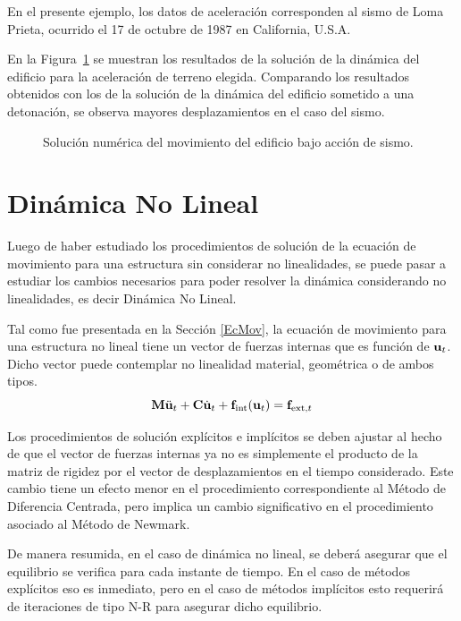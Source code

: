 En el presente ejemplo, los datos de aceleración corresponden al sismo de Loma Prieta, ocurrido el 17 de octubre de 1987 en California, U.S.A. %

En la Figura~\ref{fig:LomaPrieta} se muestran los resultados de la solución de la dinámica del edificio para la aceleración de terreno elegida. %
Comparando los resultados obtenidos con los de la solución de la dinámica del edificio sometido a una detonación, se observa mayores desplazamientos en el caso del sismo.

\begin{figure}[htb]
	\centering
	\resizebox{.95\linewidth}{!}{}
	\caption{Solución numérica del movimiento del edificio bajo acción de sismo.}
	\label{fig:LomaPrieta}
\end{figure}


\section{Dinámica No Lineal}\label{DinNoLin}

Luego de haber estudiado los procedimientos de solución de la ecuación de movimiento para una estructura sin considerar no linealidades, se puede pasar a estudiar los cambios necesarios para poder resolver la dinámica considerando no linealidades, es decir Dinámica No Lineal.

Tal como fue presentada en la Sección \ref{EcMov}, la ecuación de movimiento para una estructura no lineal tiene un vector de fuerzas internas que es función de ${\bf u}_t$. Dicho vector puede contemplar no linealidad material, geométrica o de ambos tipos.
%
\begin{equation}
{\bf M} \ddot{{\bf u}}_t + {\bf C} \dot{{\bf u}}_t + {\bf f}_{\text{int}}({\bf u}_t) = {\bf f}_{\text{ext},t}
\end{equation}

Los procedimientos de solución explícitos e implícitos se deben ajustar al hecho de que el vector de fuerzas internas ya no es simplemente el producto de la matriz de rigidez por el vector de desplazamientos en el tiempo considerado. %
%
Este cambio tiene un efecto menor en el procedimiento correspondiente al Método de Diferencia Centrada, pero implica un cambio significativo en el procedimiento asociado al Método de Newmark.

De manera resumida, en el caso de dinámica no lineal, se deberá asegurar que el equilibrio se verifica para cada instante de tiempo. En el caso de métodos explícitos eso es inmediato, pero en el caso de métodos implícitos esto requerirá de iteraciones de tipo N-R para asegurar dicho equilibrio.

